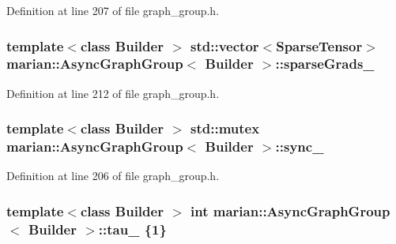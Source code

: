 Definition at line 207 of file graph\+\_\+group.\+h.

\subsubsection[{\texorpdfstring{sparse\+Grads\+\_\+}{sparseGrads_}}]{\setlength{\rightskip}{0pt plus 5cm}template$<$class Builder $>$ std\+::vector$<${\bf Sparse\+Tensor}$>$ {\bf marian\+::\+Async\+Graph\+Group}$<$ Builder $>$\+::sparse\+Grads\+\_\+\hspace{0.3cm}{\ttfamily [private]}}\hypertarget{classmarian_1_1AsyncGraphGroup_a8270ea17d3e0ad0288686ecf8680b761}{}\label{classmarian_1_1AsyncGraphGroup_a8270ea17d3e0ad0288686ecf8680b761}


Definition at line 212 of file graph\+\_\+group.\+h.

\subsubsection[{\texorpdfstring{sync\+\_\+}{sync_}}]{\setlength{\rightskip}{0pt plus 5cm}template$<$class Builder $>$ std\+::mutex {\bf marian\+::\+Async\+Graph\+Group}$<$ Builder $>$\+::sync\+\_\+\hspace{0.3cm}{\ttfamily [private]}}\hypertarget{classmarian_1_1AsyncGraphGroup_a7951c0c9d8da435a148b509ff9694d0f}{}\label{classmarian_1_1AsyncGraphGroup_a7951c0c9d8da435a148b509ff9694d0f}


Definition at line 206 of file graph\+\_\+group.\+h.

\subsubsection[{\texorpdfstring{tau\+\_\+}{tau_}}]{\setlength{\rightskip}{0pt plus 5cm}template$<$class Builder $>$ int {\bf marian\+::\+Async\+Graph\+Group}$<$ Builder $>$\+::tau\+\_\+ \{1\}\hspace{0.3cm}{\ttfamily [private]}}\hypertarget{classmarian_1_1AsyncGraphGroup_a1024a5bc27269a0ab98a2c9b6b991f71}{}\label{classmarian_1_1AsyncGraphGroup_a1024a5bc27269a0ab98a2c9b6b991f71}


